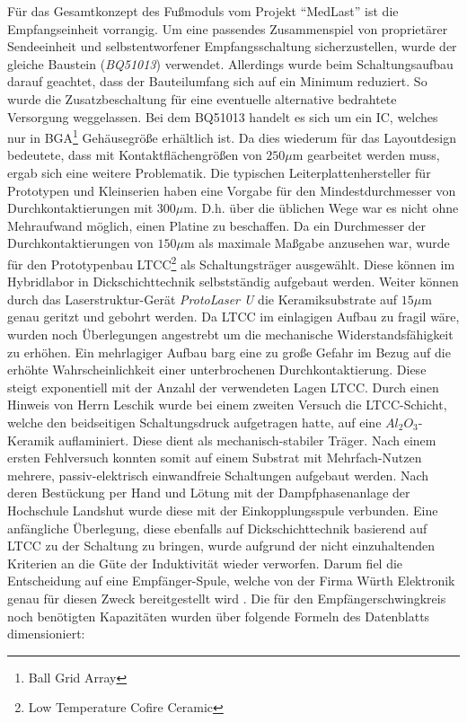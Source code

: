 \documentclass[12pt]{scrreprt} %
\begin{document}
Für das Gesamtkonzept des Fußmoduls vom Projekt "`MedLast"' ist die Empfangseinheit vorrangig. Um eine passendes Zusammenspiel von proprietärer Sendeeinheit und selbstentworfener Empfangsschaltung sicherzustellen, wurde der gleiche Baustein (\textit{BQ51013}) verwendet. Allerdings wurde beim Schaltungsaufbau darauf geachtet, dass der Bauteilumfang sich auf ein Minimum reduziert. So wurde die Zusatzbeschaltung für eine eventuelle alternative bedrahtete Versorgung weggelassen. Bei dem BQ51013 handelt es sich um ein IC, welches nur in BGA\footnote{Ball Grid Array} Gehäusegröße erhältlich ist. Da dies wiederum für das Layoutdesign bedeutete, dass mit Kontaktflächengrößen von $250\mu$m gearbeitet werden muss, ergab sich eine weitere Problematik. Die typischen Leiterplattenhersteller für Prototypen und Kleinserien haben eine Vorgabe für den Mindestdurchmesser von Durchkontaktierungen mit $300\mu$m. D.h. über die üblichen Wege war es nicht ohne Mehraufwand möglich, einen Platine zu beschaffen. Da ein Durchmesser der Durchkontaktierungen von $150\mu$m als maximale Maßgabe anzusehen war, wurde für den Prototypenbau LTCC\footnote{Low Temperature Cofire Ceramic} als Schaltungsträger ausgewählt. Diese können im Hybridlabor in Dickschichttechnik selbstständig aufgebaut werden. Weiter können durch das Laserstruktur-Gerät \textit{ProtoLaser U} die Keramiksubstrate auf $15\mu$m genau geritzt und gebohrt werden.  Da LTCC im einlagigen Aufbau zu fragil wäre, wurden noch Überlegungen angestrebt um die mechanische Widerstandsfähigkeit zu erhöhen. Ein mehrlagiger Aufbau barg eine zu große Gefahr im Bezug auf die erhöhte Wahrscheinlichkeit einer unterbrochenen Durchkontaktierung. Diese steigt exponentiell mit der Anzahl der verwendeten Lagen LTCC. Durch einen Hinweis von Herrn Leschik wurde bei einem zweiten Versuch die LTCC-Schicht, welche den beidseitigen Schaltungsdruck aufgetragen hatte, auf eine $Al_2O_3$-Keramik auflaminiert. Diese dient als mechanisch-stabiler Träger. Nach einem ersten Fehlversuch konnten somit auf einem Substrat mit Mehrfach-Nutzen mehrere, passiv-elektrisch einwandfreie Schaltungen aufgebaut werden. Nach deren Bestückung per Hand und Lötung mit der Dampfphasenanlage der Hochschule Landshut wurde diese mit der Einkopplungsspule verbunden. Eine anfängliche Überlegung, diese ebenfalls auf Dickschichttechnik basierend auf LTCC zu der Schaltung zu bringen, wurde aufgrund der nicht einzuhaltenden Kriterien an die Güte der Induktivität wieder verworfen. Darum fiel die Entscheidung auf eine Empfänger-Spule, welche von der Firma Würth Elektronik genau für diesen Zweck bereitgestellt wird \citep{Spule}. Die für den Empfängerschwingkreis noch benötigten Kapazitäten wurden über folgende Formeln des Datenblatts \citep{BQ51013} dimensioniert: 
\end{document}
